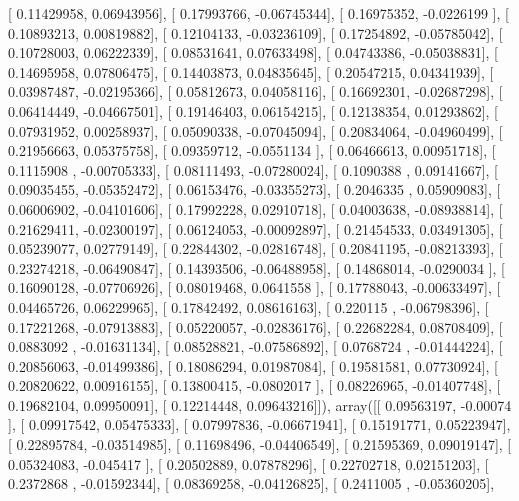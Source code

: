 \documentclass{article}
\begin{document}
       [ 0.11429958,  0.06943956],
       [ 0.17993766, -0.06745344],
       [ 0.16975352, -0.0226199 ],
       [ 0.10893213,  0.00819882],
       [ 0.12104133, -0.03236109],
       [ 0.17254892, -0.05785042],
       [ 0.10728003,  0.06222339],
       [ 0.08531641,  0.07633498],
       [ 0.04743386, -0.05038831],
       [ 0.14695958,  0.07806475],
       [ 0.14403873,  0.04835645],
       [ 0.20547215,  0.04341939],
       [ 0.03987487, -0.02195366],
       [ 0.05812673,  0.04058116],
       [ 0.16692301, -0.02687298],
       [ 0.06414449, -0.04667501],
       [ 0.19146403,  0.06154215],
       [ 0.12138354,  0.01293862],
       [ 0.07931952,  0.00258937],
       [ 0.05090338, -0.07045094],
       [ 0.20834064, -0.04960499],
       [ 0.21956663,  0.05375758],
       [ 0.09359712, -0.0551134 ],
       [ 0.06466613,  0.00951718],
       [ 0.1115908 , -0.00705333],
       [ 0.08111493, -0.07280024],
       [ 0.1090388 ,  0.09141667],
       [ 0.09035455, -0.05352472],
       [ 0.06153476, -0.03355273],
       [ 0.2046335 ,  0.05909083],
       [ 0.06006902, -0.04101606],
       [ 0.17992228,  0.02910718],
       [ 0.04003638, -0.08938814],
       [ 0.21629411, -0.02300197],
       [ 0.06124053, -0.00092897],
       [ 0.21454533,  0.03491305],
       [ 0.05239077,  0.02779149],
       [ 0.22844302, -0.02816748],
       [ 0.20841195, -0.08213393],
       [ 0.23274218, -0.06490847],
       [ 0.14393506, -0.06488958],
       [ 0.14868014, -0.0290034 ],
       [ 0.16090128, -0.07706926],
       [ 0.08019468,  0.0641558 ],
       [ 0.17788043, -0.00633497],
       [ 0.04465726,  0.06229965],
       [ 0.17842492,  0.08616163],
       [ 0.220115  , -0.06798396],
       [ 0.17221268, -0.07913883],
       [ 0.05220057, -0.02836176],
       [ 0.22682284,  0.08708409],
       [ 0.0883092 , -0.01631134],
       [ 0.08528821, -0.07586892],
       [ 0.0768724 , -0.01444224],
       [ 0.20856063, -0.01499386],
       [ 0.18086294,  0.01987084],
       [ 0.19581581,  0.07730924],
       [ 0.20820622,  0.00916155],
       [ 0.13800415, -0.0802017 ],
       [ 0.08226965, -0.01407748],
       [ 0.19682104,  0.09950091],
       [ 0.12214448,  0.09643216]]), array([[ 0.09563197, -0.00074   ],
       [ 0.09917542,  0.05475333],
       [ 0.07997836, -0.06671941],
       [ 0.15191771,  0.05223947],
       [ 0.22895784, -0.03514985],
       [ 0.11698496, -0.04406549],
       [ 0.21595369,  0.09019147],
       [ 0.05324083, -0.045417  ],
       [ 0.20502889,  0.07878296],
       [ 0.22702718,  0.02151203],
       [ 0.2372868 , -0.01592344],
       [ 0.08369258, -0.04126825],
       [ 0.2411005 , -0.05360205],
\end{document}
